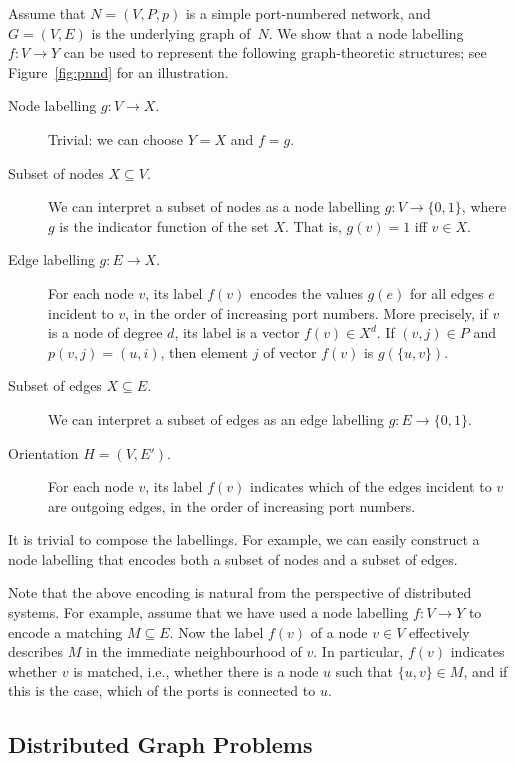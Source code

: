 Assume that $N = (V,P,p)$ is a simple port-numbered network, and $G = (V,E)$ is the underlying graph of~$N$. We show that a node labelling $f\colon V \to Y$ can be used to represent the following graph-theoretic structures; see Figure~\ref{fig:pnnd} for an illustration.
\begin{description}
    \item[Node labelling $g\colon V \to X$.]
        Trivial: we can choose $Y = X$ and $f = g$.
    \item[Subset of nodes $X \subseteq V$.]
        We can interpret a subset of nodes as a node labelling $g\colon V \to \{0,1\}$, where $g$ is the indicator function of the set $X$. That is, $g(v) = 1$ iff $v \in X$.
    \item[Edge labelling $g\colon E \to X$.]
        For each node $v$, its label $f(v)$ encodes the values $g(e)$ for all edges $e$ incident to $v$, in the order of increasing port numbers. More precisely, if $v$ is a node of degree $d$, its label is a vector $f(v) \in X^d$. If $(v,j) \in P$ and $p(v,j) = (u,i)$, then element $j$ of vector $f(v)$ is $g(\{u,v\})$.
    \item[Subset of edges $X \subseteq E$.]
        We can interpret a subset of edges as an edge labelling $g\colon E \to \{0,1\}$.
    \item[Orientation $H = (V,E')$.]
        For each node $v$, its label $f(v)$ indicates which of the edges incident to $v$ are outgoing edges, in the order of increasing port numbers.
\end{description}

It is trivial to compose the labellings. For example, we can easily construct a node labelling that encodes both a subset of nodes and a subset of edges.

Note that the above encoding is natural from the perspective of distributed systems. For example, assume that we have used a node labelling $f\colon V \to Y$ to encode a matching $M \subseteq E$. Now the label $f(v)$ of a node $v \in V$ effectively describes $M$ in the immediate neighbourhood of $v$. In particular, $f(v)$ indicates whether $v$ is matched, i.e., whether there is a node $u$ such that $\{u,v\} \in M$, and if this is the case, which of the ports is connected to $u$.

\subsection{Distributed Graph Problems}\label{ssec:distr-graph-problem}

